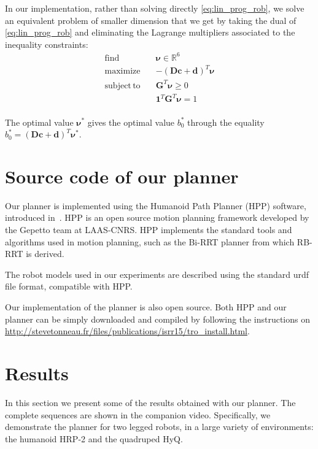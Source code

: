 \documentclass[journal]{IEEEtran}
\DeclareMathOperator*{\st}{subject\,to}					%
\DeclareMathOperator*{\maximize}{maximize}				%
\DeclareMathOperator*{\find}{find}						%
\newcommand{\Rv}[1]{\ensuremath{\mathbb{R}^{#1}}}				%
\begin{document}
In our implementation, rather than solving directly \eqref{eq:lin_prog_rob}, we solve an equivalent problem of smaller dimension that we get by taking the dual of \eqref{eq:lin_prog_rob} and eliminating the Lagrange multipliers associated to the inequality constraints:
\begin{equation} \label{eq:dual} \begin{aligned}
\find \quad & \bm{\nu} \in \Rv{6}\\
\maximize  \quad & -(\mathbf{D} \mathbf{c} + \mathbf{d})^T \bm{\nu} \\
\st \quad &\mathbf{G}^T \bm{\nu} \ge 0 \\
& \mathbf{1}^T \mathbf{G}^T \bm{\nu} = 1 \\
\end{aligned} \end{equation}

The optimal value $\bm{\nu}^*$ gives the optimal value $b_0^*$ through the equality $b_0^* = (\mathbf{D} \mathbf{c} + \mathbf{d})^T \bm{\nu}^*$.

\section{Source code of our planner}
\label{app:hpp}
Our planner is implemented using the Humanoid Path Planner (HPP) software, introduced in~\cite{7759083}.
HPP is an open source motion planning framework developed by the Gepetto team at LAAS-CNRS.
HPP implements the standard tools and algorithms used in motion planning,
such as the Bi-RRT planner from which RB-RRT is derived.

The robot models used in our experiments are described using the standard urdf file format, compatible with HPP.

Our implementation of the planner is also open source.
Both HPP and our planner can be simply downloaded and compiled by following the instructions on
\url{http://stevetonneau.fr/files/publications/isrr15/tro_install.html}. 
\section{Results}
\label{sec:results}
In this section we present some of the results obtained with our planner. The complete sequences are shown in the companion video.
Specifically, we demonstrate the planner for two legged robots, in a large variety of environments: the humanoid HRP-2 and the quadruped HyQ.
\end{document}
